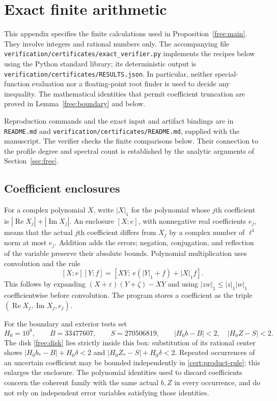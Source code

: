 \section{Exact finite arithmetic}\label{cert:arithmetic}

This appendix specifies the finite calculations used in
Proposition~\ref{free:main}.  They involve integers and rational numbers
only.  The accompanying file
\texttt{verification/}\allowbreak\texttt{certificates/}\allowbreak\texttt{exact\_verifier.py}
implements the recipes below using the Python standard library; its
deterministic output is
\texttt{verification/}\allowbreak\texttt{certificates/}\allowbreak\texttt{RESULTS.json}.  In particular,
neither special-function evaluation nor a floating-point root finder is
used to decide any inequality.  The mathematical identities that permit
coefficient truncation are proved in Lemma~\ref{free:boundary} and below.

Reproduction commands and the exact input and artifact bindings are in
\texttt{README.md} and
\texttt{verification/}\allowbreak\texttt{certificates/}\allowbreak\texttt{README.md}, supplied with the
manuscript. The verifier checks the finite comparisons below. Their
connection to the profile degree and spectral count is established by
the analytic arguments of Section~\ref{sec:free}.

\subsection{Coefficient enclosures}

For a complex polynomial $X$, write $|X|_1$ for the polynomial whose
$j$th coefficient is $|\operatorname{Re}X_j|+|\operatorname{Im}X_j|$.
An enclosure $[X;e]$, with nonnegative real coefficients $e_j$, means
that the actual $j$th coefficient differs from $X_j$ by a complex number
of $\ell^1$ norm at most $e_j$.  Addition adds the errors; negation,
conjugation, and reflection of the variable preserve their absolute
bounds.  Polynomial multiplication uses convolution and the rule
\begin{equation}\label{cert:product-rule}
 [X;e][Y;f]=[XY;\ e(|Y|_1+f)+|X|_1f].
\end{equation}
This follows by expanding $(X+\varepsilon)(Y+\zeta)-XY$ and using
$|zw|_1\le|z|_1|w|_1$ coefficientwise before convolution.
The program stores a coefficient as the triple
$(\operatorname{Re}X_j,\operatorname{Im}X_j,e_j)$.

For the boundary and exterior tests set
\begin{equation}\label{cert:integer-box}
 H_0=10^8,\qquad B=33477607,\qquad S=270506819,
 \qquad |H_0b-B|<2,\quad |H_0Z-S|<2.
\end{equation}
The disk \eqref{free:disk} lies strictly inside this box: substitution of
its rational center shows
$|H_0b_*-B|+H_0\delta<2$ and
$|H_0Z_*-S|+H_0\delta<2$.  Repeated occurrences of an uncertain
coefficient may be bounded independently in
\eqref{cert:product-rule}; this enlarges the enclosure.  The polynomial
identities used to discard coefficients concern the coherent family
with the same actual $b,Z$ in every occurrence, and do not rely on
independent error variables satisfying those identities.

